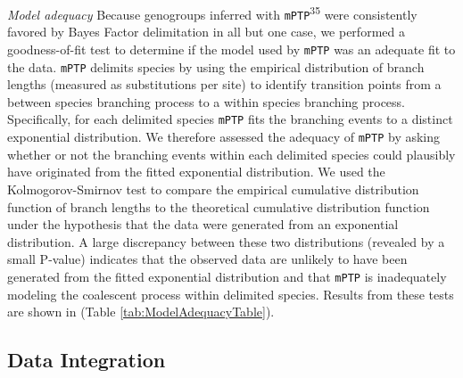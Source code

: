 \documentclass[
  11pt,
]{article}
\begin{document}
\emph{Model adequacy} Because genogroups inferred with \texttt{mPTP}\textsuperscript{35} were consistently favored by Bayes Factor delimitation in all but one case, we performed a goodness-of-fit test to determine if the model used by \texttt{mPTP} was an adequate fit to the data. \texttt{mPTP} delimits species by using the empirical distribution of branch lengths (measured as substitutions per site) to identify transition points from a between species branching process to a within species branching process. Specifically, for each delimited species \texttt{mPTP} fits the branching events to a distinct exponential distribution. We therefore assessed the adequacy of \texttt{mPTP} by asking whether or not the branching events within each delimited species could plausibly have originated from the fitted exponential distribution. We used the Kolmogorov-Smirnov test to compare the empirical cumulative distribution function of branch lengths to the theoretical cumulative distribution function under the hypothesis that the data were generated from an exponential distribution. A large discrepancy between these two distributions (revealed by a small P-value) indicates that the observed data are unlikely to have been generated from the fitted exponential distribution and that \texttt{mPTP} is inadequately modeling the coalescent process within delimited species. Results from these tests are shown in (Table \ref{tab:ModelAdequacyTable}).

\hypertarget{data-integration}{%
\subsection{Data Integration}\label{data-integration}}
\end{document}
